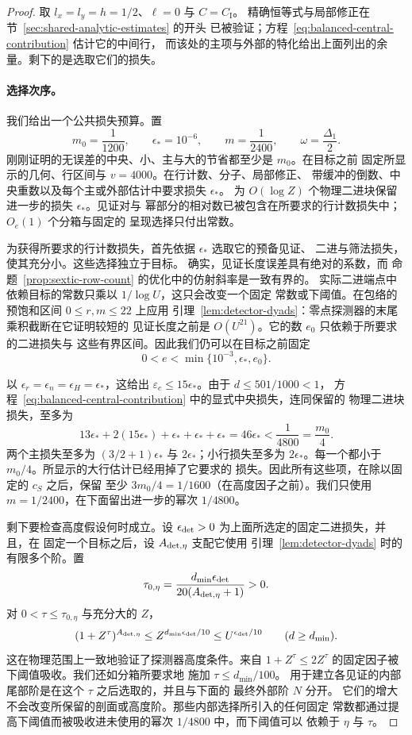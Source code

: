 \documentclass[11pt,a4paper]{article}
\numberwithin{equation}{section}
\numberwithin{figure}{section}
\theoremstyle{definition}
\theoremstyle{remark}
\begin{document}
\begin{proof}
取 $l_x=l_y=h=1/2$、$\ell=0$ 与 $C=C_{\mathrm I}$。
精确恒等式与局部修正在节~\ref{sec:shared-analytic-estimates} 的开头
已被验证；方程~\eqref{eq:balanced-central-contribution} 估计它的中间行，
而该处的主项与外部的特化给出上面列出的余量。剩下的是选取它们的损失。

\paragraph{选择次序。}
我们给出一个公共损失预算。置
\[
 m_0=\frac1{1200},\qquad \epsilon_*=10^{-6},\qquad
 m=\frac1{2400},\qquad \omega=\frac{\Delta_1}{2}.
\]
刚刚证明的无误差的中央、小、主与大的节省都至少是 $m_0$。在目标之前
固定所显示的几何、行区间与 $v=4000$。在行计数、分子、局部修正、
带缓冲的倒数、中央重数以及每个主或外部估计中要求损失 $\epsilon_*$。
为 $O(\log Z)$ 个物理二进块保留进一步的损失 $\epsilon_*$。见证对与
幂部分的相对数已被包含在所要求的行计数损失中；$O_e(1)$ 个分箱与固定的
呈现选择只付出常数。

为获得所要求的行计数损失，首先依据 $\epsilon_*$ 选取它的预备见证、
二进与筛法损失，使其充分小。这些选择独立于目标。
确实，见证长度误差具有绝对的系数，而
命题~\ref{prop:sextic-row-count} 的优化中的仿射斜率是一致有界的。
实际二进端点中依赖目标的常数只乘以 $1/\log U$，这只会改变一个固定
常数或下阈值。在包络的预饱和区间 $0\le r,m\le22$ 上应用
引理~\ref{lem:detector-dyads}：零点探测器的末尾乘积截断在它证明较短的
见证长度之前是 $O(U^{21})$。它的数 $e_0$ 只依赖于所要求的二进损失与
这些有界区间。因此我们仍可以在目标之前固定
\[
 0<e<\min\{10^{-3},\epsilon_*,e_0\}.
\]

以 $\epsilon_r=\epsilon_n=\epsilon_H=\epsilon_*$，这给出
$\varepsilon_c\le15\epsilon_*$。由于 $d\le501/1000<1$，
方程~\eqref{eq:balanced-central-contribution} 中的显式中央损失，连同保留的
物理二进块损失，至多为
\[
 13\epsilon_*+2(15\epsilon_*)+\epsilon_*+\epsilon_*+\epsilon_*
 =46\epsilon_*<\frac1{4800}=\frac{m_0}{4}.
\]
两个主损失至多为 $(3/2+1)\epsilon_*$ 与
$2\epsilon_*$；小行损失至多为 $2\epsilon_*$。每一个都小于
$m_0/4$。所显示的大行估计已经用掉了它要求的
损失。因此所有这些项，在除以固定的 $c_S$ 之后，保留
至少 $3m_0/4=1/1600$（在高度因子之前）。我们只使用
$m=1/2400$，在下面留出进一步的幂次 $1/4800$。

剩下要检查高度假设何时成立。设
$\epsilon_{\rm det}>0$ 为上面所选定的固定二进损失，并且，在
固定一个目标之后，设 $A_{{\rm det},\eta}$ 支配它使用
引理~\ref{lem:detector-dyads} 时的有限多个阶。置
\[
 \tau_{0,\eta}
 =\frac{d_{\min}\epsilon_{\rm det}}
        {20(A_{{\rm det},\eta}+1)}>0.
\]
对 $0<\tau\le\tau_{0,\eta}$ 与充分大的 $Z$，
\[
 (1+Z^\tau)^{A_{{\rm det},\eta}}
 \le Z^{d_{\min}\epsilon_{\rm det}/10}
 \le U^{\epsilon_{\rm det}/10}
 \qquad(d\ge d_{\min}).
\]
这在物理范围上一致地验证了探测器高度条件。来自
$1+Z^\tau\le2Z^\tau$ 的固定因子被下阈值吸收。我们还如分箱所要求地
施加 $\tau\le d_{\min}/100$。
用于建立各见证的内部尾部阶是在这个 $\tau$ 之后选取的，并且与下面的
最终外部阶 $N$ 分开。
它们的增大不会改变所保留的剖面或高度阶。那些内部选择所引入的任何固定
常数都通过提高下阈值而被吸收进未使用的幂次 $1/4800$ 中，而下阈值可以
依赖于 $\eta$ 与 $\tau$。


\end{proof}
\end{document}
